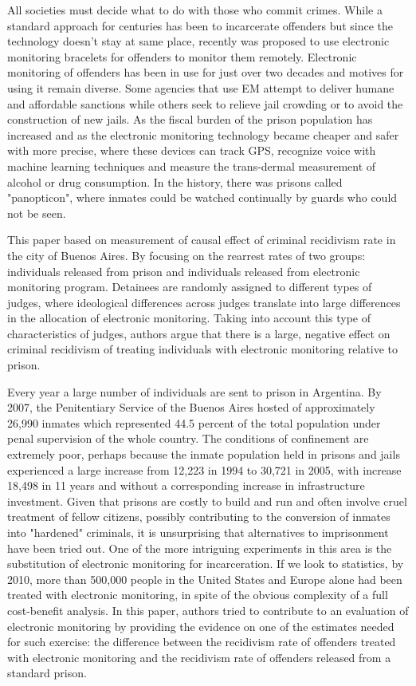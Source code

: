 \documentclass[a4paper,12pt]{article}
\begin{document}
All societies must decide what to do with those who commit crimes. While a standard approach for centuries has been to incarcerate offenders but since the technology doesn't stay at same place, recently was proposed to use electronic monitoring bracelets for offenders to monitor them remotely. Electronic monitoring of offenders has been in use for just over two decades and motives for using it remain diverse. Some agencies that use EM attempt to deliver humane and affordable sanctions while others seek to relieve jail crowding or to avoid the construction of new jails. 
As the fiscal burden of the prison population has increased and as the electronic monitoring technology became cheaper and safer with more precise, where these devices can track GPS, recognize voice with machine learning techniques and measure the trans-dermal measurement of alcohol or drug consumption. In the history, there was prisons called "panopticon", where inmates could be watched continually by guards who could not be seen.  

This paper based on measurement of causal effect of criminal recidivism rate in the city of Buenos Aires. By focusing on the rearrest rates of two groups: individuals released from prison and individuals released from electronic monitoring program. Detainees are randomly assigned to different types of judges, where ideological differences across judges translate into large differences in the allocation of electronic monitoring. Taking into account this type of characteristics of judges, authors argue that there is a large, negative effect on criminal recidivism of treating individuals with electronic monitoring relative to prison. 

Every year a large number of individuals are sent to prison in Argentina. By 2007, the Penitentiary Service of the Buenos Aires hosted of approximately 26,990 inmates which represented 44.5 percent of the total population under penal supervision of the whole country. The conditions of confinement are extremely poor, perhaps because the inmate population held in prisons and jails experienced a large increase from 12,223 in 1994 to 30,721 in 2005, with increase 18,498 in 11 years and without a corresponding increase in infrastructure investment. Given that prisons are costly to build and run and often involve cruel treatment of fellow citizens, possibly contributing to the conversion of inmates into "hardened" criminals, it is unsurprising that alternatives to imprisonment have been tried out. One of the more intriguing experiments in this area is the substitution of electronic monitoring for incarceration. If we look to statistics, by 2010, more than 500,000 people in the United States and Europe alone had been treated with electronic monitoring, in spite of the obvious complexity of a full cost-benefit analysis. In this paper, authors tried to contribute to an evaluation of electronic monitoring by providing the evidence on one of the estimates needed for such exercise: the difference between the recidivism rate of offenders treated with electronic monitoring and the recidivism rate of offenders released from a standard prison. 
\end{document}
